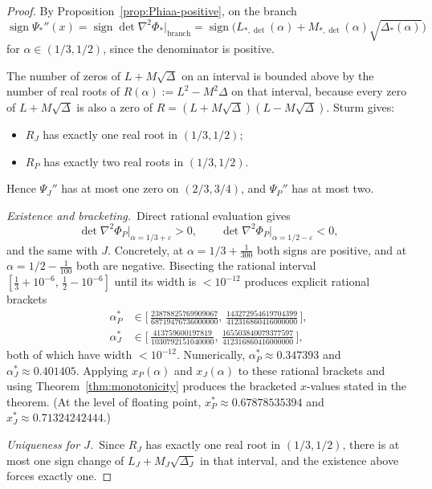 \documentclass[11pt]{amsart}
\theoremstyle{definition}
\begin{document}
\begin{proof}
By Proposition~\ref{prop:Phiaa-positive}, on the branch
\[
   \operatorname{sign}\Psi_*''(x) = \operatorname{sign}\det\nabla^2\Phi_*\big|_{\text{branch}}
   =\operatorname{sign}\bigl(L_{*,\det}(\alpha) + M_{*,\det}(\alpha)\sqrt{\Delta_*(\alpha)}\bigr)
\]
for $\alpha\in(1/3,1/2)$, since the denominator is positive.

The number of zeros of $L+M\sqrt{\Delta}$ on an interval is bounded above
by the number of real roots of $R(\alpha) := L^2 - M^2\Delta$ on that
interval, because every zero of $L+M\sqrt{\Delta}$ is also a zero of
$R = (L+M\sqrt{\Delta})(L-M\sqrt{\Delta})$.  Sturm gives:
\begin{itemize}[itemsep=2pt]
\item $R_J$ has exactly one real root in $(1/3,1/2)$;
\item $R_P$ has exactly two real roots in $(1/3,1/2)$.
\end{itemize}
Hence $\Psi_J''$ has at most one zero on $(2/3,3/4)$, and $\Psi_P''$ has at
most two.

\smallskip\noindent\emph{Existence and bracketing.}\ Direct rational
evaluation gives
\[
   \det\nabla^2\Phi_P\big|_{\alpha=1/3+\varepsilon} > 0,\qquad
   \det\nabla^2\Phi_P\big|_{\alpha=1/2-\varepsilon} < 0,
\]
and the same with $J$.  Concretely, at $\alpha=1/3+\tfrac{1}{300}$ both
signs are positive, and at $\alpha=1/2-\tfrac{1}{100}$ both are negative.
Bisecting the rational interval $[\tfrac13+10^{-6},\,\tfrac12-10^{-6}]$ until
its width is $<10^{-12}$ produces explicit rational brackets
\[
\begin{aligned}
\alpha^*_P &\in \biggl[\,\tfrac{23878825769909067}{68719476736000000},\,
                       \tfrac{143272954619704399}{412316860416000000}\,\biggr],
\\
\alpha^*_J &\in \biggl[\,\tfrac{413759600197819}{1030792151040000},\,
                       \tfrac{165503840079377597}{412316860416000000}\,\biggr],
\end{aligned}
\]
both of which have width $<10^{-12}$.  Numerically,
$\alpha^*_P \approx 0.347393$ and $\alpha^*_J \approx 0.401405$.
Applying $x_P(\alpha)$ and $x_J(\alpha)$ to these rational brackets and using
Theorem~\ref{thm:monotonicity} produces the bracketed $x$-values stated in the
theorem.  (At the level of floating point, $x^*_P\approx 0.67878535394$
and $x^*_J\approx 0.71324242444$.)

\smallskip\noindent\emph{Uniqueness for $J$.}\ Since $R_J$ has exactly one
real root in $(1/3,1/2)$, there is at most one sign change of
$L_J+M_J\sqrt{\Delta_J}$ in that interval, and the existence above forces
exactly one.


\end{proof}
\end{document}
